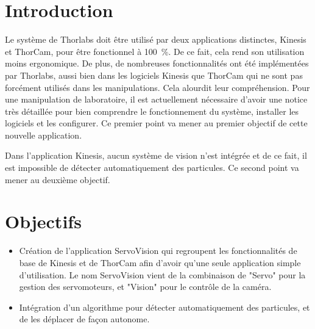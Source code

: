 \section{Introduction}

Le système de Thorlabs doit être utilisé par deux applications distinctes, Kinesis et ThorCam, pour être fonctionnel à 100~\%. De ce fait, cela rend son utilisation moins ergonomique. De plus, de nombreuses fonctionnalités ont été implémentées par Thorlabs, aussi bien dans les logiciels Kinesis que ThorCam qui ne sont pas forcément utilisés dans les manipulations. Cela alourdit leur compréhension. Pour une manipulation de laboratoire, il est actuellement nécessaire d'avoir une notice très détaillée pour bien comprendre le fonctionnement du système, installer les logiciels et les configurer. Ce premier point va mener au premier objectif de cette nouvelle application.

Dans l'application Kinesis, aucun système de vision n'est intégrée et de ce fait, il est impossible de détecter automatiquement des particules. Ce second point va mener au deuxième objectif.

\section{Objectifs}
\begin{itemize}[label=\textbullet]
    \item Création de l'application ServoVision qui regroupent les fonctionnalités de base de Kinesis et de ThorCam afin d'avoir qu'une seule application simple d'utilisation. Le nom ServoVision vient de la combinaison de "Servo" pour la gestion des servomoteurs, et "Vision" pour le contrôle de la caméra.
    \item Intégration d'un algorithme pour détecter automatiquement des particules, et de les déplacer de façon autonome.
\end{itemize}

